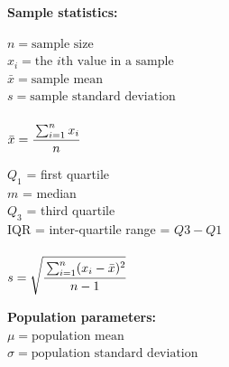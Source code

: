 \documentclass[12pt,letterpaper,addpoints]{exam}
\begin{document}

\newpage

{\bf Sample statistics:}\vspace{-10pt}
\begin{multicols}{2}\noindent
$n=\text{sample size} $\\
$x_i=\text{the $i$th value in a sample} $\\
$\bar x = \text{sample mean}$\\
$s = \text{sample standard deviation}$\\\\
$\bar x = \cfrac{\sum_{i=1}^n x_i}{n}$

\columnbreak \noindent
$Q_1$ = first quartile\\
$m$ = median\\
$Q_3$ = third quartile\\
IQR = inter-quartile range = $Q3-Q1$\\\\
$s = \sqrt{\cfrac{\sum_{i=1}^n (x_i-\bar x)^2}{n-1}}$ 
\end{multicols}

{\bf Population parameters:}\\
$\mu = \text{population mean}$\\
$\sigma = \text{population standard deviation}$\\
\end{document}

